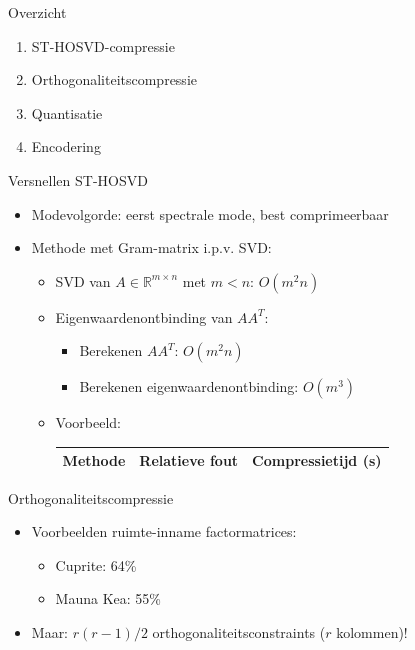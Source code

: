 \documentclass[t,12pt,dutch
\ifx\beamermode\undefined\else,\beamermode\fi
]{beamer}
\begin{document}
\begin{frame}{Overzicht}
\begin{enumerate}
\item ST-HOSVD-compressie
\item Orthogonaliteitscompressie
\item Quantisatie
\item Encodering
\end{enumerate}
\end{frame}

\begin{frame}{Versnellen ST-HOSVD}

\begin{itemize}

\item Modevolgorde: eerst spectrale mode, best comprimeerbaar

\item Methode met Gram-matrix i.p.v. SVD:
\begin{itemize}

\item SVD van $A \in \mathbb{R}^{m \times n}$ met $m < n$: $O(m^2 n)$

\item Eigenwaardenontbinding van $A A^T$:
\begin{itemize}
\item Berekenen $A A^T$: $O(m^2 n)$
\item Berekenen eigenwaardenontbinding: $O(m^3)$
\end{itemize}

\item Voorbeeld:
\begin{table}[H]
\centering
\begin{tabular}{|l|l|l|}
\hline
Methode & Relatieve fout & Compressietijd (s)\\ \hline

\end{tabular}
\end{table}

\end{itemize}
\end{itemize}
\end{frame}

\begin{frame}{Orthogonaliteitscompressie}

\begin{itemize}
\item Voorbeelden ruimte-inname factormatrices:
\begin{itemize}
\item Cuprite: 64\%
\item Mauna Kea: 55\%
\end{itemize}
\item Maar: $r (r - 1)/2$ orthogonaliteitsconstraints ($r$ kolommen)!
\end{itemize}

\end{frame}
\end{document}
